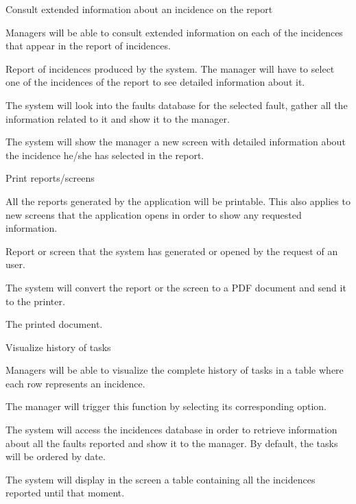 \begin{requirement}{Consult extended information about an incidence on the report}

\reqdesc Managers will be able to consult extended information on each of the incidences that appear in the report of incidences.

\reqin Report of incidences produced by the system. The manager will have to select one of the incidences of the report to see detailed information about it.

\reqsteps The system will look into the faults database for the selected fault, gather all the information related to it and show it to the manager.

\reqout The system will show the manager a new screen with detailed information about the incidence he/she has selected in the report.

\end{requirement}


\begin{requirement}{Print reports/screens}

\reqdesc All the reports generated by the application will be printable. This also applies to new screens that the application opens in order to show any requested information.

\reqin Report or screen that the system has generated or opened by the request of an user.

\reqsteps The system will convert the report or the screen to a PDF document and send it to the printer.

\reqout The printed document.

\end{requirement}


\begin{requirement}{Visualize history of tasks}

\reqdesc Managers will be able to visualize the complete
history of tasks in a table where each row represents an incidence.

\reqin The manager will trigger this function by selecting its corresponding option.

\reqsteps The system will access the incidences database in order to retrieve information about all the faults reported and show it to the manager. By default, the tasks will be ordered by date.

\reqout The system will display in the screen a table containing all the incidences reported until that moment.

\end{requirement}


